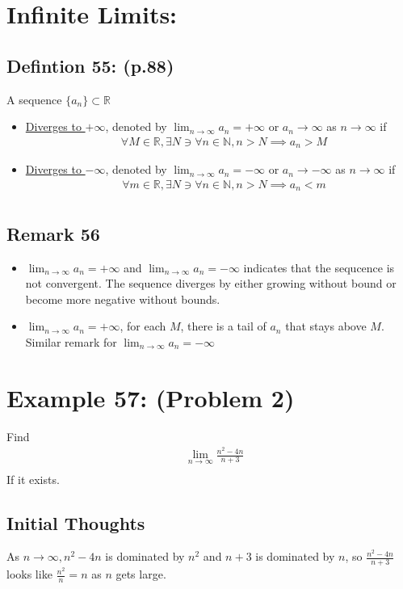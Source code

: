 \documentclass{article}
\begin{document}
\section{Infinite Limits:}
\subsection{Defintion 55: (p.88)}
A sequence $\{a_n\} \subset \mathbb{R}$
\begin{itemize}
\item \underline{Diverges to $+\infty$}, denoted by $\lim_{n \rightarrow \infty}a_n = +\infty$ or $a_n \rightarrow \infty$ as $n \rightarrow \infty$ if
\begin{align*}
 	& \forall M \in \mathbb{R}, \exists N \ni \forall n \in \mathbb{N}, n > N \implies a_n > M
\end{align*}
\item \underline{Diverges to $-\infty$}, denoted by $\lim_{n \rightarrow \infty} a_n = -\infty$ or $a_n \rightarrow -\infty$ as $n \rightarrow \infty$ if
\begin{align*}
 	& \forall m \in \mathbb{R}, \exists N \ni \forall n \in \mathbb{N}, n > N \implies a_n < m \\
\end{align*}
\end{itemize}
\subsection{Remark 56}
\begin{itemize}
\item $\lim_{n \rightarrow \infty} a_n = +\infty$ and $\lim_{n \rightarrow \infty} a_n = -\infty$ indicates that the sequcence is not convergent. The sequence diverges by either growing without bound or become more negative without bounds.
\item $\lim_{n \rightarrow \infty} a_n = +\infty$, for each $M$, there is a tail of $a_n$ that stays above $M$. Similar remark for $\lim_{n \rightarrow \infty} a_n = -\infty$
\end{itemize}
\section{Example 57: (Problem 2)}
Find
\begin{align*}
 	& \lim_{n \rightarrow \infty} \frac{n^2 - 4n}{n+3} \\
\end{align*}
If it exists.
\subsection{Initial Thoughts}
As $n \rightarrow \infty, n^2 - 4n$ is dominated by $n^2$ and $n + 3$ is dominated by $n$, so $\frac{n^2 - 4n}{n + 3}$ looks like $\frac{n^2}{n} = n$ as $n$ gets large.
\end{document}
